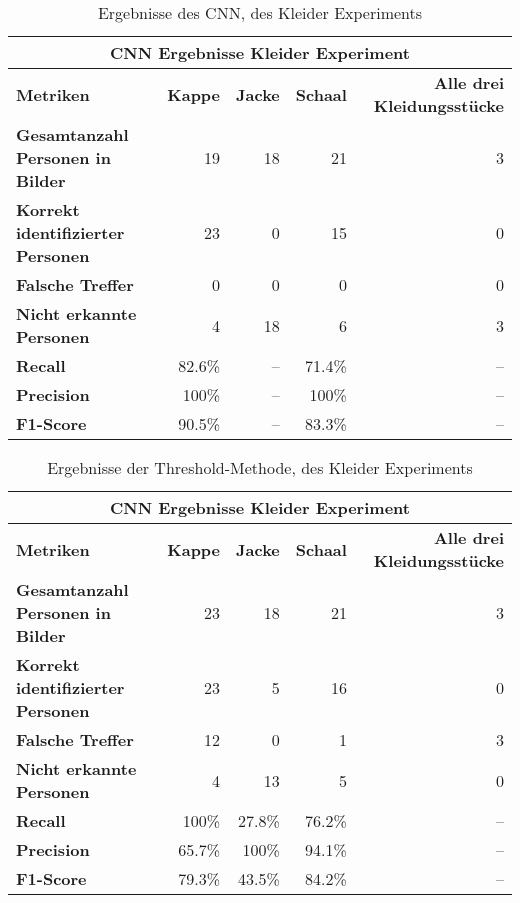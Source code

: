 {
	\renewcommand{\arraystretch}{1.3}
	\begin{table}[H]
		\centering
		\scriptsize
		\begin{tabularx}{.9\textwidth}{Xrrrr}
			\hline
			\multicolumn{5}{c}{\textbf{CNN Ergebnisse Kleider Experiment}}\\
			\hline
			\textbf{Metriken} & \textbf{Kappe} & \textbf{Jacke} & \textbf{Schaal} & \textbf{Alle drei Kleidungsstücke}\\
			\hline 
			\textbf{Gesamtanzahl Personen in Bilder} & 19 & 18 & 21 & 3\\
			\hline
			\textbf{Korrekt identifizierter Personen} & 23 & 0 & 15 & 0\\
			\hline
			\textbf{Falsche Treffer} & 0 & 0 & 0 & 0\\
			\hline
			\textbf{Nicht erkannte Personen} & 4 & 18 & 6 & 3\\
			\hline
			\textbf{Recall} & 82.6\% & -- & 71.4\% & -- \\
			\hline  
			\textbf{Precision} & 100\% & -- & 100\% & -- \\
			\hline
			\textbf{F1-Score} & 90.5\% & -- & 83.3\% & -- \\
			\hline
		\end{tabularx}
		\caption{Ergebnisse des CNN, des Kleider Experiments}
		\label{tbl:clothCNN}
	\end{table}
	\begin{table}[H]
		\centering
		\scriptsize
		\begin{tabularx}{.9\textwidth}{Xrrrr}
			\hline
			\multicolumn{5}{c}{\textbf{CNN Ergebnisse Kleider Experiment}}\\
			\hline
			\textbf{Metriken} & \textbf{Kappe} & \textbf{Jacke} & \textbf{Schaal} & \textbf{Alle drei Kleidungsstücke}\\
			\hline 
			\textbf{Gesamtanzahl Personen in Bilder} & 23 & 18 & 21 & 3\\
			\hline
			\textbf{Korrekt identifizierter Personen} & 23 & 5 & 16 & 0\\
			\hline
			\textbf{Falsche Treffer} & 12 & 0 & 1 & 3\\
			\hline
			\textbf{Nicht erkannte Personen} & 4 & 13 & 5 & 0\\
			\hline
			\textbf{Recall} & 100\% & 27.8\% & 76.2\% & -- \\
			\hline  
			\textbf{Precision} & 65.7\% & 100\% & 94.1\% & -- \\
			\hline
			\textbf{F1-Score} & 79.3\% & 43.5\% & 84.2\% & -- \\
			\hline
		\end{tabularx}
		\caption{Ergebnisse der Threshold-Methode, des Kleider Experiments}
		\label{tbl:clothThresh}
	\end{table}
}



